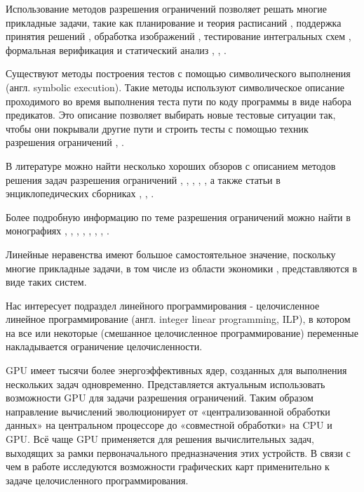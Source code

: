 \documentclass[a4paper,14pt,russian]{extreport}
\begin{document}
\par Использование методов разрешения ограничений позволяет решать многие прикладные задачи, такие как планирование \cite{kautz} и теория расписаний \cite{barnier}, поддержка принятия решений \cite{saraev}, обработка изображений \cite{montanari}, тестирование интегральных схем \cite{hooker}, формальная верификация и статический анализ \cite{collavizza}, \cite{dick}, \cite{cormac}.
\par Существуют методы построения тестов с помощью символического выполнения (англ. symbolic execution). Такие методы используют символическое описание проходимого во время выполнения теста пути по коду программы в виде набора предикатов. Это описание позволяет выбирать новые тестовые ситуации так, чтобы они покрывали другие пути и строить тесты с помощью техник разрешения ограничений \cite{gotlieb}, \cite{boyapati}. 
\par В литературе можно найти несколько хороших обзоров с описанием методов решения задач разрешения ограничений \cite{kumar}, \cite{dechter_frost}, \cite{bartak}, \cite{meseguer}, \cite{miguel}, а также статьи в энциклопедических сборниках  \cite{dechter_networks}, \cite{hower}, \cite{mackworth}.
\par Более подробную информацию по теме разрешения ограничений можно найти в монографиях \cite{apt}, \cite{fruehwirth}, \cite{marriott}, \cite{rossi}, \cite{hentenryck}, \cite{hentenryck_michel_deville}, \cite{hentenryck_opl}, \cite{hentenryck_michel}. 
\par Линейные неравенства имеют большое самостоятельное значение, поскольку многие прикладные задачи, в том числе из области экономики \cite{kantorovich}, представляются в виде таких систем. 
\par Нас интересует подраздел линейного программирования - целочисленное линейное программирование (англ. integer linear programming, ILP), в котором на все или некоторые (смешанное целочисленное программирование) переменные накладывается ограничение целочисленности. 
\par GPU имеет тысячи более энергоэффективных ядер, созданных для выполнения нескольких задач одновременно. Представляется актуальным использовать возможности GPU для задачи разрешения ограничений. Таким образом направление вычислений эволюционирует от «централизованной обработки данных» на центральном процессоре до «совместной обработки» на CPU и GPU. Всё чаще GPU применяется для решения вычислительных задач, выходящих за рамки первоначального предназначения этих устройств. В связи с чем в работе исследуются возможности графических карт применительно к задаче целочисленного программирования. 
\end{document}
